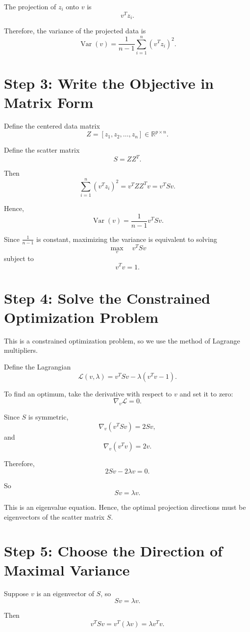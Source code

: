 \documentclass[11pt]{article}
\begin{document}
The projection of \(z_i\) onto \(v\) is
\[
v^T z_i.
\]

Therefore, the variance of the projected data is
\[
\operatorname{Var}(v)
=
\frac{1}{n-1}
\sum_{i=1}^n (v^T z_i)^2.
\]

\section*{Step 3: Write the Objective in Matrix Form}

Define the centered data matrix
\[
Z = [z_1,z_2,\dots,z_n]
\in \mathbb{R}^{p\times n}.
\]

Define the scatter matrix
\[
S = ZZ^T.
\]

Then
\[
\sum_{i=1}^n (v^Tz_i)^2
=
v^TZZ^Tv
=
v^TSv.
\]

Hence,
\[
\operatorname{Var}(v)
=
\frac{1}{n-1}v^TSv.
\]

Since \(\frac{1}{n-1}\) is constant, maximizing the variance is equivalent to solving
\[
\max_v \quad v^TSv
\]
subject to
\[
v^Tv=1.
\]

\section*{Step 4: Solve the Constrained Optimization Problem}

This is a constrained optimization problem, so we use the method of Lagrange multipliers.

Define the Lagrangian
\[
\mathcal{L}(v,\lambda)
=
v^TSv-\lambda(v^Tv-1).
\]

To find an optimum, take the derivative with respect to \(v\) and set it to zero:
\[
\nabla_v \mathcal{L}=0.
\]

Since \(S\) is symmetric,
\[
\nabla_v(v^TSv)=2Sv,
\]
and
\[
\nabla_v(v^Tv)=2v.
\]

Therefore,
\[
2Sv-2\lambda v=0.
\]

So
\[
Sv=\lambda v.
\]

This is an eigenvalue equation. Hence, the optimal projection directions must be eigenvectors of the scatter matrix \(S\).

\section*{Step 5: Choose the Direction of Maximal Variance}

Suppose \(v\) is an eigenvector of \(S\), so
\[
Sv=\lambda v.
\]

Then
\[
v^TSv
=
v^T(\lambda v)
=
\lambda v^Tv.
\]
\end{document}
